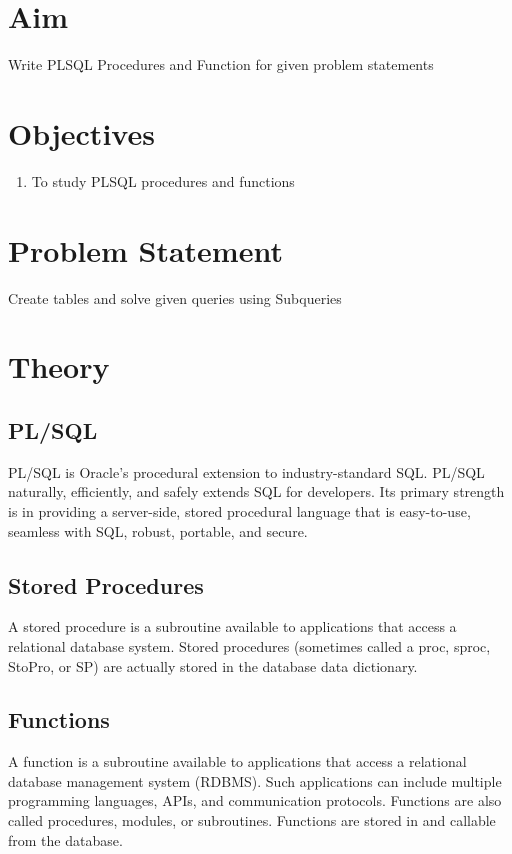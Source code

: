 \documentclass[11pt]{article}
\begin{document}
\tableofcontents
\thispagestyle{empty}
\clearpage

\setcounter{page}{1}

\section{Aim}
Write PLSQL Procedures and Function for given problem statements

\section{Objectives}
\begin{enumerate}
    \item To study PLSQL procedures and functions
\end{enumerate}


\section{Problem Statement}
Create tables and solve given queries using Subqueries

\section{Theory}
\subsection{PL/SQL}

PL/SQL is Oracle's procedural extension to industry-standard SQL. PL/SQL naturally, efficiently, and safely extends SQL for developers. Its primary strength is in providing a server-side, stored procedural language that is easy-to-use, seamless with SQL, robust, portable, and secure.

\subsection{Stored Procedures}

A stored procedure is a subroutine available to applications that access a relational database system. Stored procedures (sometimes called a proc, sproc, StoPro, or SP) are actually stored in the database data dictionary.

\subsection{Functions}

A function is a subroutine available to applications that access a relational database management system (RDBMS). Such applications can include multiple programming languages, APIs, and communication protocols. Functions are also called procedures, modules, or subroutines. Functions are stored in and callable from the database.
\end{document}
